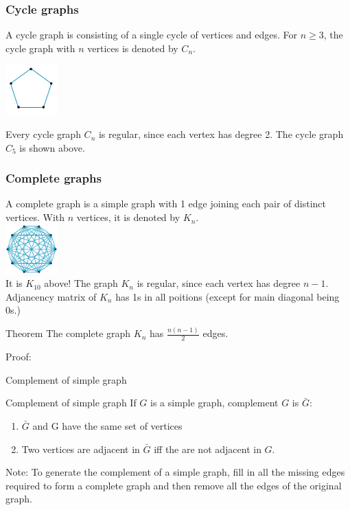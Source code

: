 \documentclass[
	11pt, %
]{beamer}
\begin{document}
\begin{frame}[t]
    \frametitle{Cycle graphs}
    A cycle graph is consisting of a single cycle of vertices and edges. For $n\geq 3$, the cycle graph with $n$ vertices is denoted by $C_n$.\\
    \begin{center}
        \includegraphics[width = 2cm]{Cycle.png}\\
    \end{center}

    Every cycle graph $C_n$ is regular, since each vertex has degree 2. The cycle graph $C_5$ is shown above.
\end{frame}

\begin{frame}[t]
    \frametitle{Complete graphs}
    A complete graph is a simple graph with 1 edge joining each pair of distinct vertices. With $n$ vertices, it is denoted by $K_n$.\\
    \includegraphics[width = 2cm]{Complete.png}\\
    It is $K_10$ above! The graph $K_n$ is regular, since each vertex has degree $n-1$. Adjancency matrix of $K_n$ has 1s in all poitions (except for main diagonal being 0s.)\\
    \begin{block}{Theorem}
        The complete graph $K_n$ has $\frac{n(n-1)}{2}$ edges.
    \end{block}
    Proof:
\end{frame}

\begin{frame}
\end{frame}

\begin{frame}{Complement of simple graph}
    \begin{block}{Complement of simple graph}
        If $G$ is a simple graph, complement $G$ is $\bar{G}$:\\
        \begin{enumerate}
            \item $\bar{G}$ and G have the same set of vertices
            \item Two vertices are adjacent in $\bar{G}$ iff the are not adjacent in $G$.
        \end{enumerate}
    \end{block}
    Note: To generate the complement of a simple graph, fill in all the missing edges required to
    form a complete graph and then remove all the edges of the original graph.
\end{frame}
\end{document}
